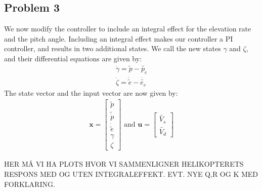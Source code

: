 \subsection{Problem 3}
We now modify the controller to include an integral effect for the elevation rate and the pitch angle. Including an integral effect makes our controller a PI controller, and results in two additional states. We call the new states $\gamma$ and $\zeta$, and their differential equations are given by:
\begin{gather*}
    \dot{\gamma} = \tilde{p} - \tilde{p_c}\\
    \dot{\zeta} = \dot{\tilde{e}} - \dot{\tilde{e_c}}
\end{gather*}
The state vector and the input vector are now given by:
\begin{gather*}
    \mathbf{x} = \begin{bmatrix}
    \tilde{p} \\ \tilde{\dot{p}} \\
    \dot{\tilde{e}} \\ \gamma \\ \zeta \end{bmatrix}
    \text{ and } \mathbf{u} = \begin{bmatrix}
    \tilde{V_s} \\ \tilde{V_d} \end{bmatrix}
\end{gather*}

HER MÅ VI HA PLOTS HVOR VI SAMMENLIGNER HELIKOPTERETS RESPONS MED OG UTEN INTEGRALEFFEKT. EVT. NYE Q,R OG K MED FORKLARING. 









